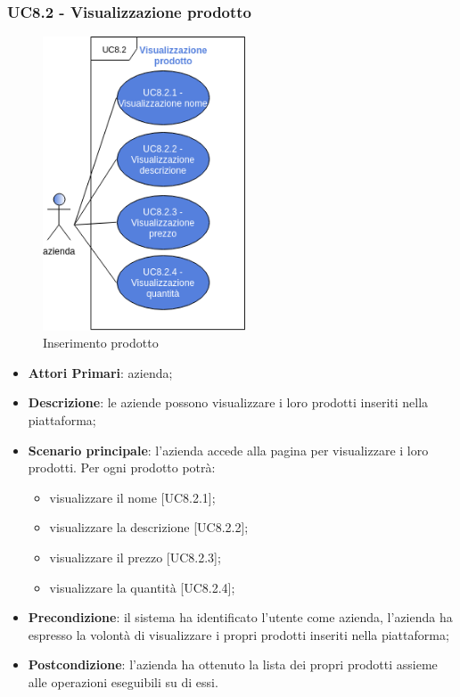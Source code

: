 \subsubsection{UC8.2 - Visualizzazione prodotto}
\begin{figure}[h]
	\includegraphics[width=6cm]{res/images/UC8-Visualizzazione.png}
	\centering
	\caption{Inserimento prodotto}
\end{figure}
\begin{itemize}
	\item \textbf{Attori Primari}: azienda;
	\item \textbf{Descrizione}: le aziende possono visualizzare i loro prodotti inseriti nella piattaforma;
	\item \textbf{Scenario principale}: l'azienda accede alla pagina per visualizzare i loro prodotti. Per ogni prodotto potrà: 
	\begin{itemize}
		\item visualizzare il nome [UC8.2.1];
		\item visualizzare la descrizione [UC8.2.2];
		\item visualizzare il prezzo [UC8.2.3];
		\item visualizzare la quantità [UC8.2.4];
	\end{itemize}
	\item \textbf{Precondizione}: il sistema ha identificato l'utente come azienda, l'azienda ha espresso la volontà di visualizzare i propri prodotti inseriti nella piattaforma;
	\item \textbf{Postcondizione}: l'azienda ha ottenuto la lista dei propri prodotti assieme alle operazioni eseguibili su di essi.	
\end{itemize}
